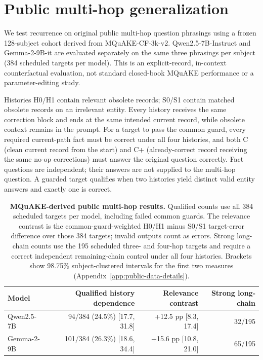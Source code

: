 \documentclass{article}
\begin{document}
\section{Public multi-hop generalization}
\label{sec:mqmh}

We test recurrence on original public multi-hop question phrasings using a frozen 128-subject cohort derived from MQuAKE-CF-3k-v2. Qwen2.5-7B-Instruct and Gemma-2-9B-it are evaluated separately on the same three phrasings per subject (384 scheduled targets per model). This is an explicit-record, in-context counterfactual evaluation, not standard closed-book MQuAKE performance or a parameter-editing study.

Histories H0/H1 contain relevant obsolete records; S0/S1 contain matched obsolete records on an irrelevant entity. Every history receives the same correction block and ends at the same intended current record, while obsolete context remains in the prompt. For a target to pass the common guard, every required current-path fact must be correct under all four histories, and both C (clean current record from the start) and C+ (already-correct record receiving the same no-op corrections) must answer the original question correctly. Fact questions are independent; their answers are not supplied to the multi-hop question. A guarded target qualifies when two histories yield distinct valid entity answers and exactly one is correct.

\begin{table}[!htbp]
\caption{\textbf{MQuAKE-derived public multi-hop results.} Qualified counts use all 384 scheduled targets per model, including failed common guards. The relevance contrast is the common-guard-weighted H0/H1 minus S0/S1 target-error difference over those 384 targets; invalid outputs count as errors. Strong long-chain counts use the 195 scheduled three- and four-hop targets and require a correct independent remaining-chain control under all four histories. Brackets show 98.75\% subject-clustered intervals for the first two measures (Appendix~\ref{app:public-data-details}).}
\label{tab:mqmh}
\centering
\small
\begin{tabular}{lrrr}
\toprule
Model & Qualified history dependence & Relevance contrast & Strong long-chain \\
\midrule
Qwen2.5-7B & 94/384 (24.5\%) [17.7, 31.8] & +12.5 pp [8.3, 17.4] & 32/195 \\
Gemma-2-9B & 101/384 (26.3\%) [18.6, 34.4] & +15.6 pp [10.8, 21.0] & 65/195 \\
\bottomrule
\end{tabular}
\end{table}
\end{document}
